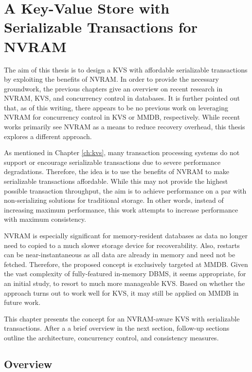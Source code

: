 \chapter{A Key-Value Store with Serializable Transactions for NVRAM}
\label{ch:concept}

The aim of this thesis is to design a \ac{KVS} with affordable serializable
transactions by exploiting the benefits of \ac{NVRAM}. In order to provide the
necessary groundwork, the previous chapters give an overview on recent research
in \ac{NVRAM}, \ac{KVS}, and concurrency control in databases. It is further
pointed out that, as of this writing, there appears to be no previous work on
leveraging \ac{NVRAM} for concurrency control in \ac{KVS} or \ac{MMDB},
respectively. While recent works primarily see \ac{NVRAM} as a means to reduce
recovery overhead, this thesis explores a different approach.

As mentioned in Chapter \ref{ch:kvs}, many transaction processing systems do not
support or encourage serializable transactions due to severe performance
degradations. Therefore, the idea is to use the benefits of \ac{NVRAM} to make
serializable transactions affordable. While this may not provide the highest
possible transaction throughput, the aim is to achieve performance on a par with
non-serializing solutions for traditional storage. In other words, instead of
increasing maximum performance, this work attempts to increase performance with
maximum consistency.

\ac{NVRAM} is especially significant for memory-resident databases as data no
longer need to copied to a much slower storage device for recoverability. Also,
restarts can be near-instantaneous as all data are already in memory and need
not be fetched. Therefore, the proposed concept is exclusively targeted at
\ac{MMDB}. Given the vast complexity of fully-featured in-memory \ac{DBMS}, it
seems appropriate, for an initial study, to resort to much more manageable
\ac{KVS}. Based on whether the approach turns out to work well for \ac{KVS}, it
may still be applied on \ac{MMDB} in future work.

This chapter presents the concept for an \ac{NVRAM}-aware \ac{KVS} with
serializable transactions. After a a brief overview in the next section,
follow-up sections outline the architecture, concurrency control, and
consistency measures.

\section{Overview}
\label{ch:concept-overview}


